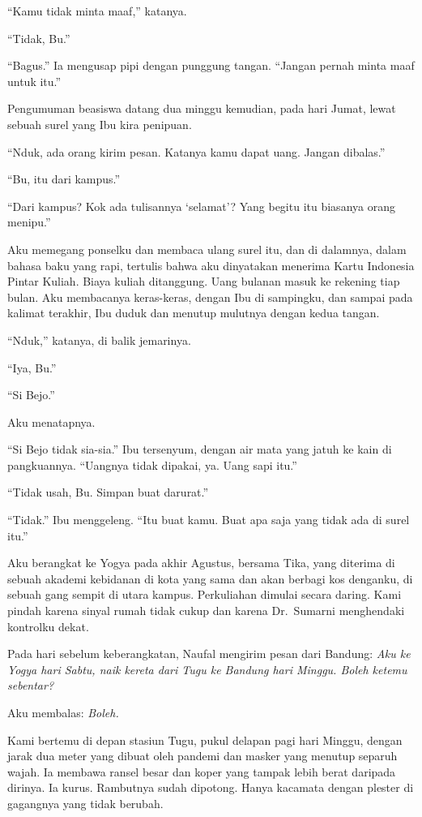 \documentclass[11pt,twoside,openany]{book}
\makeatletter
\newcommand{\scenebreak}{\par\vspace{0.9em}{\centering\textsc{*\hspace{0.7em}*\hspace{0.7em}*}\par}\vspace{0.9em}\@afterindentfalse\@afterheading}
\makeatother
\begin{document}
``Kamu tidak minta maaf,'' katanya.

``Tidak, Bu.''

``Bagus.'' Ia mengusap pipi dengan punggung tangan. ``Jangan pernah minta maaf untuk itu.''

\scenebreak
Pengumuman beasiswa datang dua minggu kemudian, pada hari Jumat, lewat sebuah surel yang Ibu kira penipuan.

``Nduk, ada orang kirim pesan. Katanya kamu dapat uang. Jangan dibalas.''

``Bu, itu dari kampus.''

``Dari kampus? Kok ada tulisannya `selamat'? Yang begitu itu biasanya orang menipu.''

Aku memegang ponselku dan membaca ulang surel itu, dan di dalamnya, dalam bahasa baku yang rapi, tertulis bahwa aku dinyatakan menerima Kartu Indonesia Pintar Kuliah. Biaya kuliah ditanggung. Uang bulanan masuk ke rekening tiap bulan. Aku membacanya keras-keras, dengan Ibu di sampingku, dan sampai pada kalimat terakhir, Ibu duduk dan menutup mulutnya dengan kedua tangan.

``Nduk,'' katanya, di balik jemarinya.

``Iya, Bu.''

``Si Bejo.''

Aku menatapnya.

``Si Bejo tidak sia-sia.'' Ibu tersenyum, dengan air mata yang jatuh ke kain di pangkuannya. ``Uangnya tidak dipakai, ya. Uang sapi itu.''

``Tidak usah, Bu. Simpan buat darurat.''

``Tidak.'' Ibu menggeleng. ``Itu buat kamu. Buat apa saja yang tidak ada di surel itu.''

\scenebreak
Aku berangkat ke Yogya pada akhir Agustus, bersama Tika, yang diterima di sebuah akademi kebidanan di kota yang sama dan akan berbagi kos denganku, di sebuah gang sempit di utara kampus. Perkuliahan dimulai secara daring. Kami pindah karena sinyal rumah tidak cukup dan karena Dr.~Sumarni menghendaki kontrolku dekat.

Pada hari sebelum keberangkatan, Naufal mengirim pesan dari Bandung: \emph{Aku ke Yogya hari Sabtu, naik kereta dari Tugu ke Bandung hari Minggu. Boleh ketemu sebentar?}

Aku membalas: \emph{Boleh.}

Kami bertemu di depan stasiun Tugu, pukul delapan pagi hari Minggu, dengan jarak dua meter yang dibuat oleh pandemi dan masker yang menutup separuh wajah. Ia membawa ransel besar dan koper yang tampak lebih berat daripada dirinya. Ia kurus. Rambutnya sudah dipotong. Hanya kacamata dengan plester di gagangnya yang tidak berubah.
\end{document}

